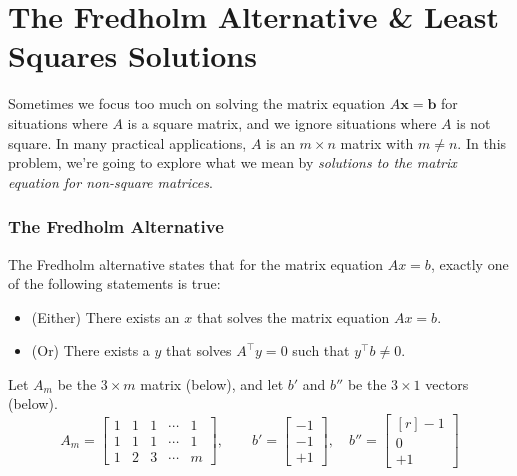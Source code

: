 
\section{The Fredholm Alternative \& Least Squares Solutions}
Sometimes we focus too much on solving the matrix equation $A \bm{x} = \bm{b}$ for situations where $A$ is a square matrix,  and we ignore situations where $A$ is not square. In many practical applications,  $A$ is an $m \times n$ matrix with $m \neq n$. In this problem, we're going to explore what we mean by \textit{solutions to the matrix equation for non-square matrices}.

\subsubsection*{The Fredholm Alternative}
The Fredholm alternative states that for the matrix equation $Ax=b$, exactly one of the following statements is true:
\begin{itemize}
    \item (Either) There exists an $x$ that solves the matrix equation $Ax=b$.
    \item (Or) There exists a $y$ that solves $A^\top y = 0$ such that $y^\top b \neq 0$.
\end{itemize}
Let $A_m$ be the $3 \times m$ matrix (below), and let $b'$ and $b''$ be the $3 \times 1$ vectors (below).
\begin{equation*}
A_m = \begin{bmatrix} 1 & 1 & 1 & \cdots & 1\\ 1 & 1 & 1 & \cdots & 1 \\ 1 & 2 & 3 &  \cdots & m \end{bmatrix}, \quad  \quad b' = \begin{bmatrix} -1 \\ -1 \\ +1 \end{bmatrix}, \quad b'' = \begin{bmatrix*}[r] -1 \\ 0 \\ +1 \end{bmatrix*}
\end{equation*}

